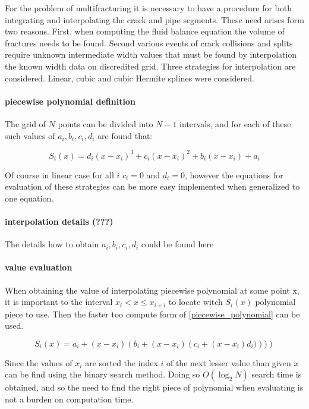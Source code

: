
For the problem of multifracturing  it is necessary to have a procedure for both integrating and interpolating the crack and pipe segments. These need arises form two reasons. 
First, when computing the fluid balance equation the volume of fractures needs to be found. Second various events of crack collisions and splits require unknown intermediate width values that must be found by interpolation the known width data on discredited grid. Three strategies for interpolation are considered. Linear, cubic and cubic Hermite splines were considered.

\paragraph{piecewise polynomial definition}

 The grid of $N$ points can be divided into $N-1$ intervals, and for each of these such values of $a_i, b_i, c_i, d_i$ are found that:

\begin{equation}\label{piecewise_polynomial}
S_i(x)=d_i(x-x_i)^3+c_i(x-x_i)^2+b_i(x-x_i)+a_i
\end{equation}

Of course in linear case for all $i$ $c_i=0$ and $d_i=0$, however the equations for evaluation of these strategies can be more easy implemented when generalized to one equation.

\paragraph{interpolation details (???)}
The details how to obtain $a_i, b_i, c_i, d_i$ could be found here



\paragraph{value evaluation}
When obtaining the value of interpolating piecewise polynomial at some point x, it is important to the interval $x_i < x\le x_{i+i}$  to locate witch  $S_i(x)$ polynomial piece to use. Then the faster too compute form of \eqref{piecewise_polynomial} can be used.

\begin{equation}
S_i(x)=a_i+\left(x-x_i\right)\left(b_i+\left(x-x_i\right)\left(c_i+\left(x-x_i\right) d_i)\right))\right)
\end{equation}

Since the values of $x_i$ are sorted the index $i$ of the next lesser value than given $x$ can be find using the binary search method. Doing so $O(\log_2 N)$ search time is obtained, and so the need to find the right piece of polynomial when evaluating is not a burden on computation time.


